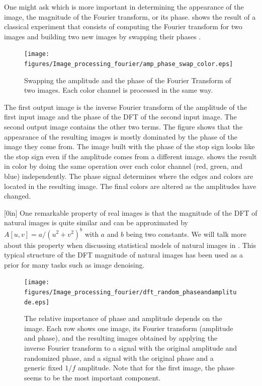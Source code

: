One might ask which is more important in determining the appearance of the image, the magnitude
of the Fourier transform, or its phase.  \Fig{\ref{fig:phaseoramp}} shows the result of a classical experiment that consists of computing the Fourier transform for two images and building two new images by swapping their phases \cite{Oppenheim1981}.


\begin{figure}
	\centerline{
		\texttt{[image: figures/Image\_processing\_fourier/amp\_phase\_swap\_color.eps]}}
	\caption{Swapping the amplitude and the phase of the Fourier Transform of two images. Each color channel is processed in the same way.}
	\label{fig:phaseoramp}
\end{figure}

The first output image is the inverse Fourier transform of the amplitude of the first input image and the phase of the DFT of the second input image. The second output image contains the other two terms. The figure shows that the appearance of the resulting images is mostly dominated by the phase of the image they come from. The image built with the phase of the stop sign looks like the stop sign even if the amplitude comes from a different image. \Fig{\ref{fig:phaseoramp}} shows the result in color by doing the same operation over each color channel (red, green, and blue) independently. The phase signal determines where the edges and colors are located in the resulting image. The final colors are altered as the amplitudes have changed.


[0in]
One remarkable property of real images is that the magnitude of the DFT of natural images is quite similar and can be approximated by $A \left[u,v \right] = a/ (u^2+v^2)^b$ with $a$ and $b$ being two constants. We will talk more about this property when discussing statistical models of natural images in \chap{\ref{chapter:stat_image_models}}. This typical structure of the DFT magnitude of natural images has been used as a prior for many tasks such as image denoising.


\begin{figure}[t]
	\centerline{
		\texttt{[image: figures/Image\_processing\_fourier/dft\_random\_phaseandamplitude.eps]}}
	\caption{The relative importance of phase and amplitude depends on the image. Each row shows one image, its Fourier transform (amplitude and phase), and the resulting images obtained by applying the inverse Fourier transform to a signal with the original amplitude and randomized phase, and a signal with the original phase and a generic fixed $1/f$ amplitude. Note that for the first image, the phase seems to be the most important component.
	}
	\label{fig:phasevsamp}
\end{figure}

